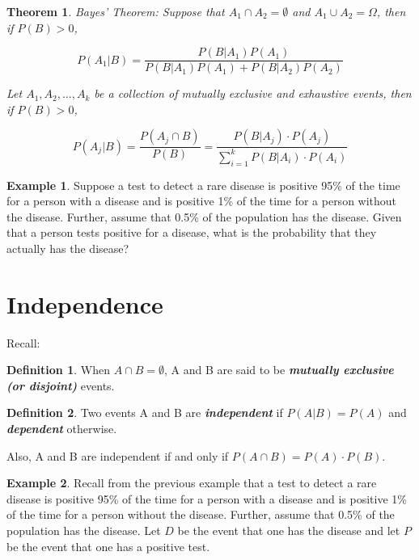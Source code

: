 \documentclass[
  11pt,
  oneside]{book}
\newtheorem{theorem}{Theorem}[chapter]
\theoremstyle{definition}
\newtheorem{definition}{Definition}[chapter]
\theoremstyle{definition}
\newtheorem{example}{Example}[chapter]
\theoremstyle{definition}
\theoremstyle{definition}
\theoremstyle{remark}
\begin{document}
\vfill

\begin{theorem}
Bayes' Theorem: Suppose that \(A_1 \cap A_2 = \emptyset\) and \(A_1 \cup A_2 = \Omega\), then if \(P(B)>0\),

\[ P(A_1|B) = \frac{P(B|A_1)P(A_1)}{P(B|A_1)P(A_1)+P(B|A_2)P(A_2)} \]

\smallskip

Let \(A_1, A_2, \ldots, A_k\) be a collection of mutually exclusive and exhaustive events, then if \(P(B)>0\),

\[P(A_j|B) = \frac{P(A_j \cap B)}{P(B)} = \frac{P(B|A_j) \cdot P(A_j)}{\sum_{i=1}^k P(B|A_i) \cdot P(A_i)}
\]
\end{theorem}

\smallskip

\begin{example}
Suppose a test to detect a rare disease is positive 95\% of the time for a person with a disease and is positive 1\% of the time for a person without the disease. Further, assume that 0.5\% of the population has the disease. Given that a person tests positive for a disease, what is the probability that they actually has the disease?
\end{example}

\vfill

\newpage

\section{Independence}\label{independence}

Recall:

\begin{definition}
When \(A \cap B = \emptyset\), A and B are said to be \textbf{\emph{mutually exclusive (or disjoint)}} events.
\end{definition}

\begin{definition}
Two events A and B are \textbf{\emph{independent}} if \(P(A|B) = P(A)\) and \textbf{\emph{dependent}} otherwise.

Also, A and B are independent if and only if \(P(A \cap B) = P(A) \cdot P(B)\).
\end{definition}

\begin{example}
Recall from the previous example that a test to detect a rare disease is positive 95\% of the time for a person with a disease and is positive 1\% of the time for a person without the disease. Further, assume that 0.5\% of the population has the disease. Let \(D\) be the event that one has the disease and let \(P\) be the event that one has a positive test.
\end{example}
\end{document}
